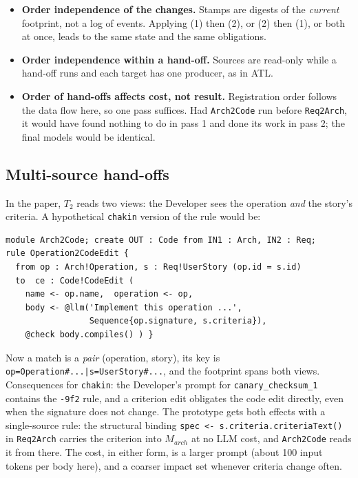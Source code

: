 \documentclass[10pt,a4paper]{article}
\newcommand{\code}[1]{\texttt{#1}}
\theoremstyle{definition}
\begin{document}
\begin{itemize}[nosep]
\item \textbf{Order independence of the changes.} Stamps are digests of the
\emph{current} footprint, not a log of events. Applying (1) then (2), or (2)
then (1), or both at once, leads to the same state and the same obligations.
\item \textbf{Order independence within a hand-off.} Sources are read-only
while a hand-off runs and each target has one producer, as in ATL.
\item \textbf{Order of hand-offs affects cost, not result.} Registration
order follows the data flow here, so one pass suffices. Had \code{Arch2Code}
run before \code{Req2Arch}, it would have found nothing to do in pass 1 and
done its work in pass 2; the final models would be identical.
\end{itemize}

\subsection{Multi-source hand-offs}\label{sec:multisrc}

In the paper, $T_2$ reads two views: the Developer sees the operation
\emph{and} the story's criteria. A hypothetical \texttt{chakin} version of
the rule would be:

\begin{lstlisting}[language=ATL, style=model, caption={Illustrative multi-source \code{Arch2Code} (the paper's design; the prototype uses \code{op.spec} instead).}]
module Arch2Code; create OUT : Code from IN1 : Arch, IN2 : Req;
rule Operation2CodeEdit {
  from op : Arch!Operation, s : Req!UserStory (op.id = s.id)
  to  ce : Code!CodeEdit (
    name <- op.name,  operation <- op,
    body <- @llm('Implement this operation ...',
                 Sequence{op.signature, s.criteria}),
    @check body.compiles() ) }
\end{lstlisting}

Now a match is a \emph{pair} (operation, story), its key is
\code{op=Operation\#...|s=UserStory\#...}, and the footprint spans both views.
Consequences for \texttt{chakin}: the Developer's prompt for
\code{canary_checksum_1} contains the \code{-9f2} rule, and a criterion
edit obligates the code edit directly, even when the signature does not
change. The prototype gets both effects with a single-source rule: the
structural binding \code{spec <- s.criteria.criteriaText()} in
\code{Req2Arch} carries the criterion into $M_{\mathit{arch}}$ at no LLM
cost, and \code{Arch2Code} reads it from there. The cost, in either form, is
a larger prompt (about 100 input tokens per body here), and a coarser impact
set whenever criteria change often.
\end{document}
